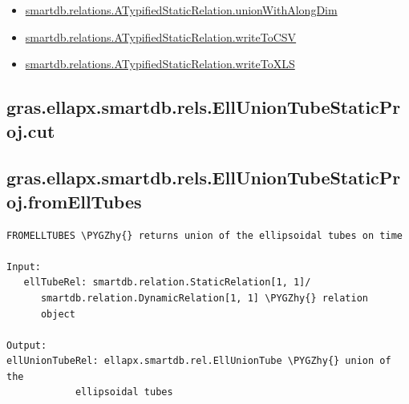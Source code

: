 \documentclass[letterpaper,10pt,english]{sphinxmanual}
\def\PYGZhy{\char`\-}
\begin{document}
\begin{itemize}
\item {} 
{\hyperref[chap_functions:smartdb-relations-atypifiedstaticrelation-unionwithalongdim]{smartdb.relations.ATypifiedStaticRelation.unionWithAlongDim}}

\item {} 
{\hyperref[chap_functions:smartdb-relations-atypifiedstaticrelation-writetocsv]{smartdb.relations.ATypifiedStaticRelation.writeToCSV}}

\item {} 
{\hyperref[chap_functions:smartdb-relations-atypifiedstaticrelation-writetoxls]{smartdb.relations.ATypifiedStaticRelation.writeToXLS}}

\end{itemize}


\subsection{gras.ellapx.smartdb.rels.EllUnionTubeStaticProj.cut}
\label{chap_functions:gras-ellapx-smartdb-rels-elluniontubestaticproj-cut}

\subsection{gras.ellapx.smartdb.rels.EllUnionTubeStaticProj.fromEllTubes}
\label{chap_functions:gras-ellapx-smartdb-rels-elluniontubestaticproj-fromelltubes}
\begin{Verbatim}[commandchars=\\\{\}]
FROMELLTUBES \PYGZhy{} returns union of the ellipsoidal tubes on time

Input:
   ellTubeRel: smartdb.relation.StaticRelation[1, 1]/
      smartdb.relation.DynamicRelation[1, 1] \PYGZhy{} relation
      object

Output:
ellUnionTubeRel: ellapx.smartdb.rel.EllUnionTube \PYGZhy{} union of the
            ellipsoidal tubes
\end{Verbatim}
\end{document}
